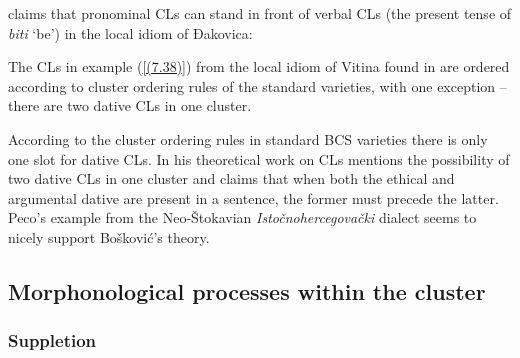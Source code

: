 \noindent \citet[152]{Stevanovic50} claims that pronominal CLs can stand in front of verbal CLs (the present tense of \textit{biti} ‘be’) in the local idiom of Đakovica:


\noindent The CLs in example (\ref{(7.38)}) from the local idiom of Vitina found in \citet[345]{Peco07b} are ordered according to cluster ordering rules of the standard varieties, with one exception – there are two dative CLs in one cluster. 


\noindent According to the cluster ordering rules in standard BCS varieties there is only one slot for dative CLs. In his theoretical work on CLs \citet[62]{Boskovic01} mentions the possibility of two dative CLs in one cluster and claims that when both the ethical and argumental dative are present in a sentence, the former must precede the latter. Peco’s example from the Neo-Štokavian \textit{Istočnohercegovački} dialect seems to nicely support Bošković’s theory.

\subsection{Morphonological processes within the cluster}
\label{Morphological processes within the cluster}
\subsubsection{Suppletion}

